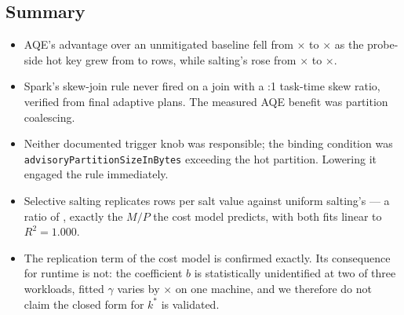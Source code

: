 \subsection{Summary}

\begin{itemize}
\item AQE's advantage over an unmitigated baseline fell from
\AqeSpeedupThin$\times$ to \AqeSpeedupThick$\times$ as the probe-side hot key
grew from \PThin{} to \PThick{} rows, while salting's rose from
\SaltSpeedupThin$\times$ to \SaltSpeedupThick$\times$.
\item Spark's skew-join rule never fired on a join with a
\BaseSkewThick:1 task-time skew ratio, verified from final adaptive plans. The
measured AQE benefit was partition coalescing.
\item Neither documented trigger knob was responsible; the binding condition
was \texttt{advisoryPartitionSizeInBytes} exceeding the hot partition. Lowering
it engaged the rule immediately.
\item Selective salting replicates \SelRecSlope{} rows per salt value against
uniform salting's \UnifRecSlope{} --- a ratio of \RecSlopeRatio, exactly the
$M/P$ the cost model predicts, with both fits linear to $R^{2}=1.000$.
\item The replication term of the cost model is confirmed exactly. Its
consequence for runtime is not: the coefficient $b$ is statistically
unidentified at two of three workloads, fitted $\gamma$ varies by
\GammaSpread$\times$ on one machine, and we therefore do not claim the closed
form for $k^{*}$ is validated.
\end{itemize}
